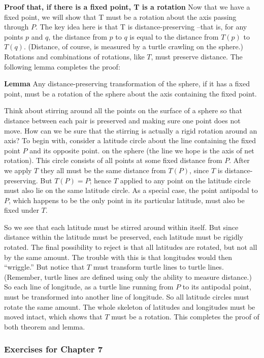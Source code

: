 \documentclass{book}
\begin{document}
\textbf{Proof that, if there is a fixed point, T is a rotation} Now that we have
a fixed point, we will show that T must be a rotation about the axis
passing through $P$. The key idea here is that T is distance-preserving --that is, for any points $p$ and $q$, the distance from $p$ to $q$ is equal to the
distance from $T(p)$ to $T(q)$. (Distance, of course, is measured by a turtle
crawling on the sphere.) Rotations and combinations of rotations, like
$T$, must preserve distance. The following lemma completes the proof:

\textbf{Lemma} Any distance-preserving transformation of the sphere, if it has
a fixed point, must be a rotation of the sphere about the axis containing
the fixed point.

Think about stirring around all the points on the surface of a sphere
so that distance between each pair is preserved and making sure one
point does not move. How can we be sure that the stirring is actually a
rigid rotation around an axis? To begin with, consider a latitude circle
about the line containing the fixed point $P$ and its opposite point. on the
sphere (the line we hope is the axis of net rotation). This circle consists
of all points at some fixed distance from $P$. After we apply $T$ they all
must be the same distance from $T(P)$, since $T$ is distance-preserving.
But $T(P) = P$; hence $T$ applied to any point on the latitude circle must
also lie on the same latitude circle. As a special case, the point antipodal
to $P$, which happens to be the only point in its particular latitude, must
also be fixed under $T$.

So we see that each latitude must be stirred around within itself. But
since distance within the latitude must be preserved, each latitude must
be rigidly rotated. The final possibility to reject is that all latitudes
are rotated, but not all by the same amount. The trouble with this is
that longitudes would then ``wriggle.'' But notice that $T$ must transform
turtle lines to turtle lines. (Remember, turtle lines are defined using only
the ability to measure distance.) So each line of longitude, as a turtle
line running from $P$ to its antipodal point, must be transformed into
another line of longitude. So all latitude circles must rotate the same
amount. The whole skeleton of latitudes and longitudes must be moved
intact, which shows that $T$ must be a rotation. This completes the proof
of both theorem and lemma.

\subsubsection{Exercises for Chapter 7}
\end{document}
